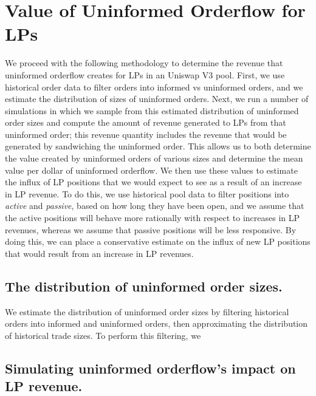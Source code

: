 \section{Value of Uninformed Orderflow for LPs} \label{section:lp-oflow-value}
We proceed with the following methodology to determine the revenue that uninformed orderflow creates for LPs in an Uniswap V3 pool.
First, we use historical order data to filter orders into informed vs uninformed orders, and we estimate the distribution of sizes of uninformed orders.
Next, we run a number of simulations in which we sample from this estimated distribution of uninformed order sizes and compute the amount of revenue generated to LPs from that uninformed order; this revenue quantity includes the revenue that would be generated by sandwiching the uninformed order. This allows us to both determine the value created by uninformed orders of various sizes and determine the mean value per dollar of uninformed orderflow.
We then use these values to estimate the influx of LP positions that we would expect to see as a result of an increase in LP revenue. To do this, we use historical pool data to filter positions into \textit{active} and \textit{passive}, based on how long they have been open, and we assume that the active positions will behave more rationally with respect to increases in LP revenues, whereas we assume that passive positions will be less responsive. By doing this, we can place a conservative estimate on the influx of new LP positions that would result from an increase in LP revenues.

\subsection{The distribution of uninformed order sizes.}
We estimate the distribution of uninformed order sizes by filtering historical orders into informed and uninformed orders, then approximating the distribution of historical trade sizes. To perform this filtering, we


\subsection{Simulating uninformed orderflow's impact on LP revenue.}

